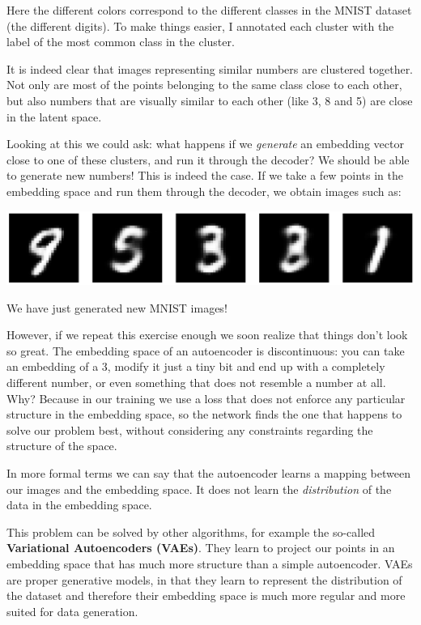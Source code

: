 Here the different colors correspond to the different classes in the MNIST dataset (the different digits). To make things easier, I annotated each cluster with the label of the most common class in the cluster. \newline

It is indeed clear that images representing similar numbers are clustered together. Not only are most of the points belonging to the same class close to each other, but also numbers that are visually similar to each other (like 3, 8 and 5) are close in the latent space. \newline

Looking at this we could ask: what happens if we \textit{generate} an embedding vector close to one of these clusters, and run it through the decoder? We should be able to generate new numbers! This is indeed the case. If we take a few points in the embedding space and run them through the decoder, we obtain images such as:

\includegraphics[width=1\linewidth]{img//cnn//autoencoders/generated-mnist.jpeg}

We have just generated new MNIST images! \newline

However, if we repeat this exercise enough we soon realize that things don't look so great. The embedding space of an autoencoder is discontinuous: you can take an embedding of a 3, modify it just a tiny bit and end up with a completely different number, or even something that does not resemble a number at all. Why? Because in our training we use a loss that does not enforce any particular structure in the embedding space, so the network finds the one that happens to solve our problem best, without considering any constraints regarding the structure of the space. \newline

In more formal terms we can say that the autoencoder learns a mapping between our images and the embedding space. It does not learn the \textit{distribution} of the data in the embedding space. \newline

This problem can be solved by other algorithms, for example the so-called \textbf{Variational Autoencoders (VAEs)}. They learn to project our points in an embedding space that has much more structure than a simple autoencoder. VAEs are proper generative models, in that they learn to represent the distribution of the dataset and therefore their embedding space is much more regular and more suited for data generation. \newline

